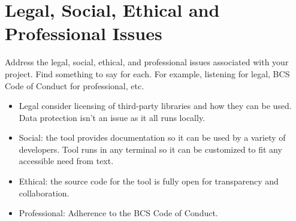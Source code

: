 
\chapter{Legal, Social, Ethical and Professional Issues}

Address the legal, social, ethical, and professional
issues associated with your project. Find something to say for each. For example, listening for legal,
BCS Code of Conduct for professional, etc.

\begin{itemize}
\item Legal consider licensing of third-party libraries and how they can be
    used. Data protection isn't an issue as it all runs locally.
\item Social: the tool provides documentation so it can be used by a variety of
    developers. Tool runs in any terminal so it can be customized to fit any
    accessible need from text. 
\item Ethical: the source code for the tool is fully open for transparency and
    collaboration. 
\item Professional: Adherence to the BCS Code of Conduct.
\end{itemize}
